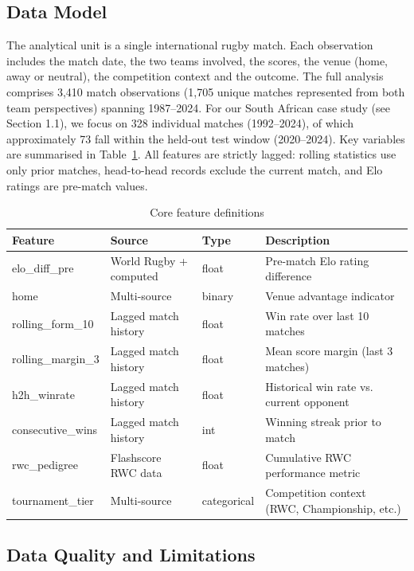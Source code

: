 \documentclass[12pt,a4paper,onecolumn]{article}
\renewcommand{\arraystretch}{1}
\begin{document}
\subsection{Data Model}
The analytical unit is a single international rugby match. Each observation includes the match date, the two teams involved, the scores, the venue (home, away or neutral), the competition context and the outcome. The full analysis comprises 3,410 match observations (1,705 unique matches represented from both team perspectives) spanning 1987–2024. For our South African case study (see Section 1.1), we focus on 328 individual matches (1992–2024), of which approximately 73 fall within the held-out test window (2020–2024).
Key variables are summarised in Table~\ref{tab:features}. All features are strictly lagged: rolling statistics use only prior matches, head-to-head records exclude the current match, and Elo ratings are pre-match values. \cite{Bergmeir2012}

\begin{table}[H]
\centering
\caption{Core feature definitions}
\label{tab:features}
\scriptsize
\renewcommand{\arraystretch}{0.9}
\begin{tabularx}{\textwidth}{lllX}
\toprule
\textbf{Feature} & \textbf{Source} & \textbf{Type} & \textbf{Description} \\
\midrule
elo\_diff\_pre & World Rugby + computed & float & Pre-match Elo rating difference \\
home & Multi-source & binary & Venue advantage indicator \\
rolling\_form\_10 & Lagged match history & float & Win rate over last 10 matches \\
rolling\_margin\_3 & Lagged match history & float & Mean score margin (last 3 matches) \\
h2h\_winrate & Lagged match history & float & Historical win rate vs. current opponent \\
consecutive\_wins & Lagged match history & int & Winning streak prior to match \\
rwc\_pedigree & Flashscore RWC data & float & Cumulative RWC performance metric \\
tournament\_tier & Multi-source & categorical & Competition context (RWC, Championship, etc.) \\
\bottomrule
\end{tabularx}
\end{table}

\subsection{Data Quality and Limitations}
\end{document}
